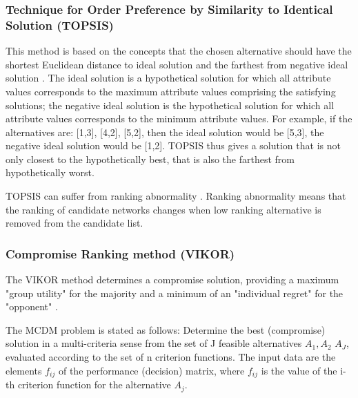 \subsubsection{Technique for Order Preference by Similarity to Identical Solution (TOPSIS)}
This method is based on the concepts that the chosen alternative should have the shortest Euclidean distance to ideal solution and the farthest from negative ideal solution \cite{MCDM}. The ideal solution is a hypothetical solution for which all attribute values corresponds to the maximum attribute values comprising the satisfying solutions; the negative ideal solution is the hypothetical solution for which all attribute values corresponds to the minimum attribute values.
For example, if the alternatives are: [1,3], [4,2], [5,2], then the ideal solution would be [5,3], the negative ideal solution would be [1,2].
TOPSIS thus gives a solution that is not only closest to the hypothetically best, that is also the farthest from hypothetically worst.

TOPSIS can suffer from ranking abnormality \cite{SAWvsTOPSIS}.
Ranking abnormality means that the ranking of candidate networks changes when low ranking alternative is removed from the candidate list.

\subsubsection{Compromise Ranking method (VIKOR)}
The VIKOR method determines a compromise solution, providing a maximum "group utility" for the majority and a minimum of an "individual regret" for the "opponent" \cite{VIKORformula}.

The MCDM problem is stated as follows: Determine the best (compromise) solution in a multi-criteria sense from the set of J feasible alternatives $A_{1}, A_{2}$ \textellipsis $A_{J}$, evaluated according to the set of n criterion functions. The input data are the elements $f_{ij}$ of the performance (decision) matrix, where $f_{ij}$ is the value of the i-th criterion function for the alternative $A_{j}$.

